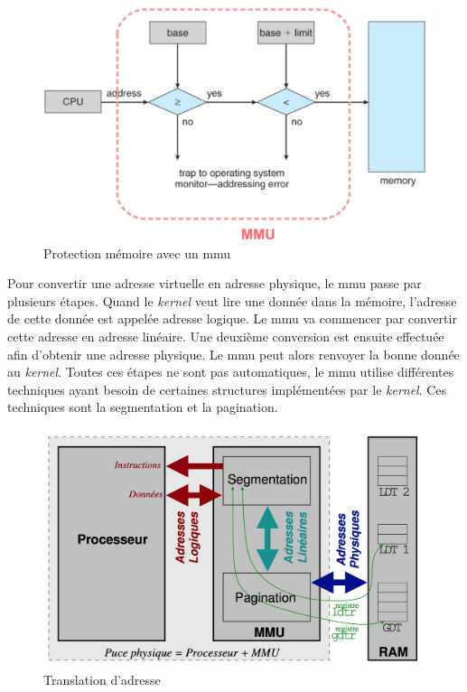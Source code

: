 \begin{figure}[!h]
  \centering
  \includegraphics[scale=0.4]{images/mmu.png}
  \caption{Protection mémoire avec un \acrshort{mmu}}
  \label{mmu}
\end{figure}

Pour convertir une adresse virtuelle en adresse physique, le \acrshort{mmu} passe
par plusieurs étapes. Quand le \textit{kernel} veut lire une donnée dans la mémoire,
l'adresse de cette donnée est appelée adresse logique. Le \acrshort{mmu} va commencer
par convertir cette adresse en adresse linéaire. Une deuxième conversion est ensuite
effectuée afin d'obtenir une adresse physique. Le \acrshort{mmu} peut alors renvoyer
la bonne donnée au \textit{kernel}. Toutes ces étapes ne sont pas automatiques,
le \acrshort{mmu} utilise différentes techniques ayant besoin de certaines structures
implémentées par le \textit{kernel}. Ces techniques sont la segmentation et la
pagination.

\begin{figure}[!h]
  \centering
  \includegraphics[scale=0.5]{images/addr_translation.png}
  \caption{Translation d'adresse}
  \label{addr_translation}
\end{figure}

